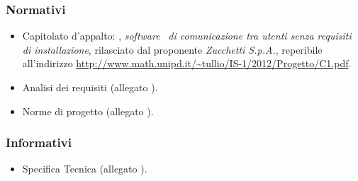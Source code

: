{{	\subsubsection{Normativi}{
	    \begin{itemize}
		\item Capitolato d'appalto: \textbf{\mytalk}, \textit{software}\g~ \textit{di comunicazione tra utenti senza requisiti  di installazione}, rilasciato dal proponente \textit{Zucchetti S.p.A.}, reperibile all'indirizzo \url{http://www.math.unipd.it/~tullio/IS-1/2012/Progetto/C1.pdf}.
		\item Analisi dei requisiti (allegato \textit{\AnalisiDeiRequisiti}).
		\item Norme di progetto (allegato \textit{\NormeDiProgetto}).
	    \end{itemize}
	}
	\subsubsection{Informativi}{
	    \begin{itemize}
			\item Specifica Tecnica (allegato \textit{\SpecificaTecnica}).	
	    \end{itemize}
	}
    }
}
